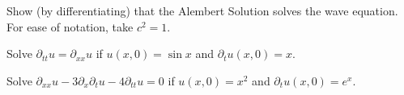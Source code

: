 \documentclass[12pt]{exam}
\newcommand{\px}{\partial_x}
\newcommand{\pt}{\partial_t}
\newcommand{\pxx}{\partial_{xx}}
\newcommand{\ptt}{\partial_{tt}}
\begin{document}
\begin{questions}
\begin{question}
\end{question}
\begin{solutionorbox}[\stretch{1}]
\end{solutionorbox}


\newpage 
\begin{question}
Show (by differentiating) that the Alembert Solution solves the wave equation. For ease of notation, take 
$c^2 = 1$. 
\end{question}
\begin{solutionorbox}[\stretch{1}]
\end{solutionorbox}


\newpage 
\begin{question}
Solve $\ptt u = \pxx u$ if $u(x,0) = \sin x$ and $\pt u(x,0) = x$.
\end{question}
\begin{solutionorbox}[\stretch{1}]
\end{solutionorbox}

\newpage 
\begin{question}
Solve $\pxx u - 3\px\pt u - 4\ptt u = 0$ if $u(x,0) = x^2$ and $\pt u(x,0)=e^x$.
\end{question}
\begin{solutionorbox}[\stretch{1}]
\end{solutionorbox}
\end{questions}
\end{document}
